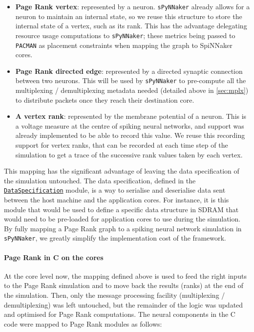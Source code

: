 \begin{itemize}
\item \textbf{Page Rank vertex}: represented by a neuron. \texttt{sPyNNaker} already allows for a neuron to maintain an internal state, so we reuse this structure to store the internal state of a vertex, such as its rank. This has the advantage delegating resource usage computations to \texttt{sPyNNaker}; these metrics being passed to \texttt{PACMAN} as placement constraints when mapping the graph to SpiNNaker cores.

\item \textbf{Page Rank directed edge}: represented by a directed synaptic connection between two neurons. This will be used by \texttt{sPyNNaker} to pre-compute all the multiplexing / demultiplexing metadata needed (detailed above in \ref{sec:mplx}) to distribute packets once they reach their destination core.

\item \textbf{A vertex rank}: represented by the membrane potential of a neuron. This is a voltage measure at the centre of spiking neural networks, and support was already implemented to be able to record this value. We reuse this recording support for vertex ranks, that can be recorded at each time step of the simulation to get a trace of the successive rank values taken by each vertex.
\end{itemize}

This mapping has the significant advantage of leaving the data specification of the simulation untouched. The data specification, defined in the \href{https://github.com/SpiNNakerManchester/DataSpecification}{\texttt{DataSpecification}} module, is a way to serialise and deserialise data sent between the host machine and the application cores. For instance, it is this module that would be used to define a specific data structure in SDRAM that would need to be pre-loaded for application cores to use during the simulation. By fully mapping a Page Rank graph to a spiking neural network simulation in \texttt{sPyNNaker}, we greatly simplify the implementation cost of the framework.

\paragraph{Page Rank in C on the cores}

At the core level now, the mapping defined above is used to feed the right inputs to the Page Rank simulation and to move back the results (ranks) at the end of the simulation. Then, only the message processing facility (multiplexing / demultiplexing) was left untouched, but the remainder of the logic was updated and optimised for Page Rank computations. The neural components in the C code were mapped to Page Rank modules as follows:


